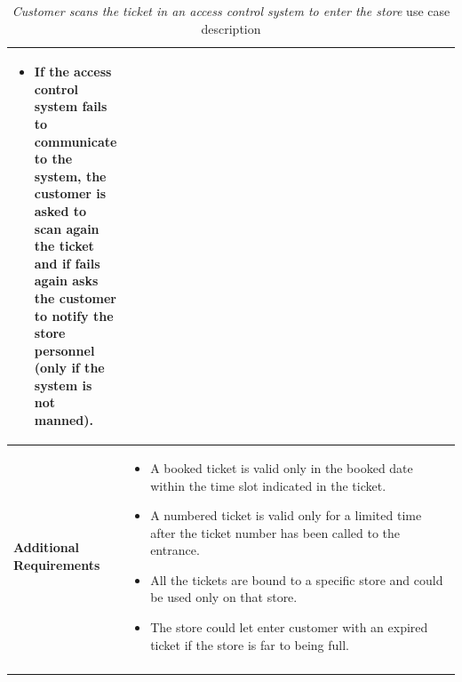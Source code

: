 \begin{longtable}{p{0.25\linewidth}p{0.75\linewidth}}
\begin{itemize}
        \item If the access control system fails to communicate to the system, the customer is asked to scan again the ticket and if fails again asks the customer to notify the store personnel (only if the system is not manned).
    \end{itemize}                                                                                                      \\
    \bottomrule
    \textbf{Additional \linebreak Requirements} &
    \begin{itemize}
        \item A booked ticket is valid only in the booked date within the time slot indicated in the ticket.
        \item A numbered ticket is valid only for a limited time after the ticket number has been called to the entrance.
        \item All the tickets are bound to a specific store and could be used only on that store.
        \item The store could let enter customer with an expired ticket if the store is far to being full.
    \end{itemize}                                                                                                      \\
    \bottomrule
    \caption{\emph{Customer scans the ticket in an access control system to enter the store} use case description}
\end{longtable}

